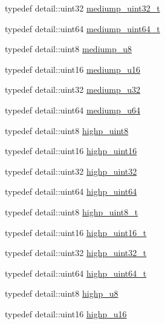 \begin{DoxyCompactItemize}
\item 
typedef detail\-::uint32 \hyperlink{group__gtc__type__precision_gac7782c1e393f9ad47e41a177a685f287}{mediump\-\_\-uint32\-\_\-t}
\item 
typedef detail\-::uint64 \hyperlink{group__gtc__type__precision_gaa97354d3120a6dc029a5e9563723de18}{mediump\-\_\-uint64\-\_\-t}
\item 
typedef detail\-::uint8 \hyperlink{group__gtc__type__precision_gac04b372784392e82bd557f300c4de097}{mediump\-\_\-u8}
\item 
typedef detail\-::uint16 \hyperlink{group__gtc__type__precision_ga6745262ef6a6fdb8637b2387ef924828}{mediump\-\_\-u16}
\item 
typedef detail\-::uint32 \hyperlink{group__gtc__type__precision_gad0c27a525045c299a92306eb4cd7c13a}{mediump\-\_\-u32}
\item 
typedef detail\-::uint64 \hyperlink{group__gtc__type__precision_ga00c51a16fa190b0a90205d50d6d8a44a}{mediump\-\_\-u64}
\item 
typedef detail\-::uint8 \hyperlink{group__gtc__type__precision_ga2c27c6dd26e893786f04b10f99c1ee95}{highp\-\_\-uint8}
\item 
typedef detail\-::uint16 \hyperlink{group__gtc__type__precision_ga4d32967d45ba8365e2a05eaaac85e978}{highp\-\_\-uint16}
\item 
typedef detail\-::uint32 \hyperlink{group__gtc__type__precision_ga3145e44c73e2df7dfe4f3cb65974bf22}{highp\-\_\-uint32}
\item 
typedef detail\-::uint64 \hyperlink{group__gtc__type__precision_ga8079c653e20cda03d34b99de629a7b09}{highp\-\_\-uint64}
\item 
typedef detail\-::uint8 \hyperlink{group__gtc__type__precision_ga9ba529fcc75b82d23da979f0ce6e4518}{highp\-\_\-uint8\-\_\-t}
\item 
typedef detail\-::uint16 \hyperlink{group__gtc__type__precision_ga3145bc0ee80432c165e985a188a722b3}{highp\-\_\-uint16\-\_\-t}
\item 
typedef detail\-::uint32 \hyperlink{group__gtc__type__precision_ga8eb85ad460079c63b68866ae34637bda}{highp\-\_\-uint32\-\_\-t}
\item 
typedef detail\-::uint64 \hyperlink{group__gtc__type__precision_ga6e66f40c5909bfc872b068187fa6029e}{highp\-\_\-uint64\-\_\-t}
\item 
typedef detail\-::uint8 \hyperlink{group__gtc__type__precision_ga8a60abe782749c504fb5ae51eb8b49cc}{highp\-\_\-u8}
\item 
typedef detail\-::uint16 \hyperlink{group__gtc__type__precision_ga9da2178d7501d9c0f225fa1a7b70cb45}{highp\-\_\-u16}

\end{DoxyCompactItemize}
